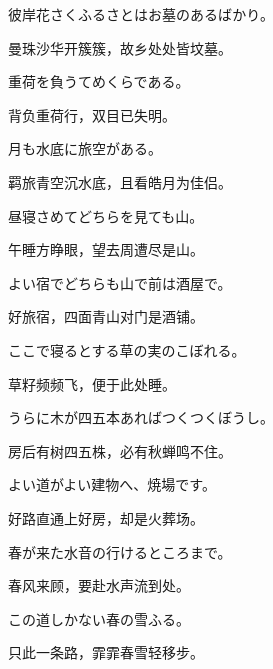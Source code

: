 \begin{haiku}
    {\FH 彼岸花さくふるさとはお墓のあるばかり。}

    {\FK 曼珠沙华开簇簇，故乡处处皆坟墓。}
\end{haiku}

\begin{haiku}
    {\FH 重荷を負うてめくらである。}

    {\FK 背负重荷行，双目已失明。}
\end{haiku}

\begin{haiku}
    {\FH 月も水底に旅空がある。}

    {\FK 羁旅青空沉水底，且看皓月为佳侣。}
\end{haiku}

\begin{haiku}
    {\FH 昼寝さめてどちらを見ても山。}

    {\FK 午睡方睁眼，望去周遭尽是山。}
\end{haiku}

\begin{haiku}
    {\FH よい宿でどちらも山で前は酒屋で。}

    {\FK 好旅宿，四面青山对门是酒铺。}
\end{haiku}

\begin{haiku}
    {\FH ここで寝るとする草の実のこぼれる。}

    {\FK 草籽频频飞，便于此处睡。}
\end{haiku}

\begin{haiku}
    {\FH うらに木が四五本あればつくつくぼうし。}

    {\FK 房后有树四五株，必有秋蝉鸣不住。}
\end{haiku}

\begin{haiku}
    {\FH よい道がよい建物へ、焼場です。}

    {\FK 好路直通上好房，却是火葬场。}
\end{haiku}

\begin{haiku}
    {\FH 春が来た水音の行けるところまで。}

    {\FK 春风来顾，要赴水声流到处。}
\end{haiku}

\begin{haiku}
    {\FH この道しかない春の雪ふる。}

    {\FK 只此一条路，霏霏春雪轻移步。}
\end{haiku}

